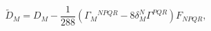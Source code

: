 \begin{equation}
\label{covariant}
{\tilde D}_{M}=D_{M}-
\frac{1}{288}(\Gamma_M{}^{NPQR}-8\delta_M^N\Gamma^{PQR})F_{NPQR},
\label{supercovariant}
\end{equation}

